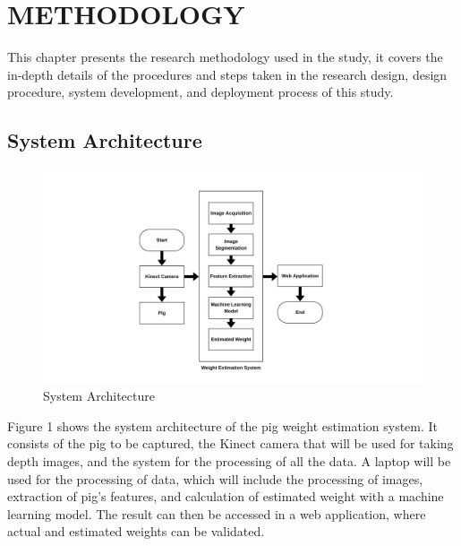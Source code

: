 \chapter{METHODOLOGY}
{\baselineskip
	
This chapter presents the research methodology used in the study, it covers the in-depth details of the procedures and steps taken in the research design, design procedure, system development, and deployment process of this study.


\section { System Architecture}

\begin{figure}[h]
	\centering
	\includegraphics[height=0.4\textheight]{figures/Architectureofniggas}
	\caption{System Architecture}
	\label{fig:System Architecture}
\end{figure}

Figure 1 shows the system architecture of the pig weight estimation system. It consists of the pig to be captured, the Kinect camera that will be used for taking depth images, and the system for the processing of all the data. A laptop will be used for the processing of data, which will include the processing of images, extraction of pig’s features, and calculation of estimated weight with a machine learning model. The result can then be accessed in a web application, where actual and estimated weights can be validated.

}
